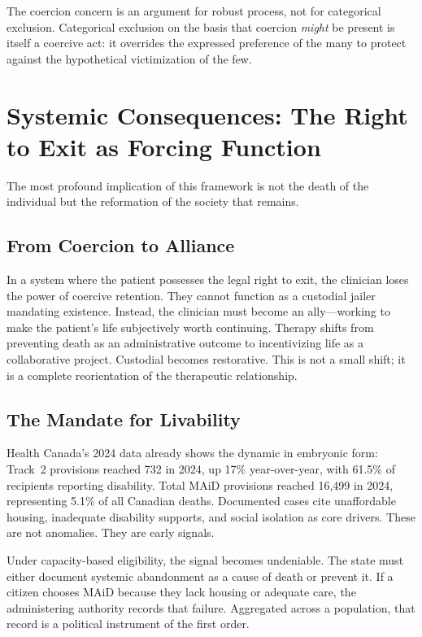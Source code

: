 \documentclass[11pt, letterpaper]{article}
\begin{document}
The coercion concern is an argument for robust process, not for categorical exclusion.
Categorical exclusion on the basis that coercion \emph{might} be present is itself a coercive
act: it overrides the expressed preference of the many to protect against the hypothetical
victimization of the few.

\newpage

\section{Systemic Consequences: The Right to Exit as Forcing Function}

The most profound implication of this framework is not the death of the individual but the
reformation of the society that remains.

\subsection{From Coercion to Alliance}

In a system where the patient possesses the legal right to exit, the clinician loses the
power of coercive retention. They cannot function as a custodial jailer mandating existence.
Instead, the clinician must become an ally---working to make the patient's life subjectively
worth continuing. Therapy shifts from preventing death as an administrative outcome to
incentivizing life as a collaborative project. Custodial becomes restorative. This is not
a small shift; it is a complete reorientation of the therapeutic relationship.

\subsection{The Mandate for Livability}

Health Canada's 2024 data already shows the dynamic in embryonic form: Track~2 provisions
reached 732 in 2024, up 17\% year-over-year, with 61.5\% of recipients reporting disability.
Total MAiD provisions reached 16,499 in 2024, representing 5.1\% of all Canadian deaths.
Documented cases cite unaffordable housing, inadequate disability supports, and social
isolation as core drivers. These are not anomalies. They are early signals.

Under capacity-based eligibility, the signal becomes undeniable. The state must either
document systemic abandonment as a cause of death or prevent it. If a citizen chooses MAiD
because they lack housing or adequate care, the administering authority records that failure.
Aggregated across a population, that record is a political instrument of the first order.
\end{document}
